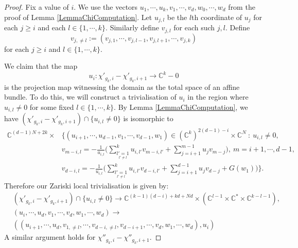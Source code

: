\documentclass[11pt]{amsart}
\newcommand{\bC}{\mathbb{C}}
\numberwithin{equation}{section}
\renewcommand{\geq}{\geqslant}
\newcommand{\C}{\mathbb C}
\begin{document}
\begin{proof}
	Fix a value of $i$. We use the vectors $u_1,\cdots,u_k,v_1,\cdots,v_d,w_0,\cdots,w_d$ from the proof of Lemma \ref{LemmaChiComputation}.
	Let $u_{j,l}$ be the $l$th coordinate of $u_j$ for each $j \geq i$ and each $l \in \{1,\cdots,k\}$.
	Similarly define $v_{j,l}$ for each such $j,l$.
	Define
	\begin{equation}
		v_{j,\neq l} := (v_{j,1},\cdots,v_{j,l-1},v_{j,l+1},\cdots,v_{j,k})
	\end{equation}
	for each $j \geq i$ and $l \in \{1,\cdots,k\}$.




	We claim that the map
	\begin{equation}
		u_i: \chi'_{g_k,i}-\chi'_{g_k,i+1} \to \C^k-0
	\end{equation}
	is the projection map witnessing the domain as the total space of an affine bundle.
	To do this, we will construct a trivialisation of $u_i$ in the region where $u_{i,l} \neq 0$ for some fixed $l \in \{1,\cdots,k\}$.
	By Lemma \ref{LemmaChiComputation}, we have $(\chi'_{g_k,i}-\chi'_{g_k,i+1}) \cap \{u_{i,l} \neq 0\}$ is isomorphic to
	\begin{equation} \label{eqnMainChiEqn2}
		\begin{aligned}
			\bC^{(d-1)N+2k} \times & \Big\{(u_{i+1},\cdots,u_{d-1},v_1,\cdots,v_{d-1},w_1)  \in (\bC^{k})^{2(d-1)-i} \times \bC^N \ : \
			u_{i,l} \neq 0,                                                                                                                                      \\ &
			v_{m-i,l} = -\frac{1}{u_{i,l}}\Big(\sum_{\underset{l' \neq l}{l'=1}}^k u_{i,l'}v_{m-i,l'} + \sum_{j=i+1}^{m-1} u_j v_{m-j}\Big), \ m=i+1,\cdots,d-1, \\ &
			v_{d-i,l} = -\frac{1}{u_{i,l}}\Big(\sum_{\underset{l' \neq l}{l'=1}}^k u_{i,l'}v_{d-i,l'} + \sum_{j=i+1}^{d-1} u_j v_{d-j}+G(w_1)\Big) \Big\}.
		\end{aligned}
	\end{equation}
	Therefore our Zariski local trivialisation is given by:
	\begin{equation}
		\begin{aligned}
			 & (\chi'_{g_k,i}-\chi'_{g_k,i+1}) \cap \{u_{i,l} \neq 0\} \to \bC^{(k-1)(d-i) + kd + Nd} \times (\bC^{l-1} \times \bC^* \times \bC^{k-l-1}),
			\\  & (u_i,\cdots,u_d,v_1,\cdots,v_d,w_1,\cdots,w_d) \to \\ &  ((u_{i+1},\cdots,u_d,v_{1,\neq l},\cdots,v_{d-i,\neq l},v_{d-i+1},\cdots,v_d,w_1,\cdots,w_d),u_i)
		\end{aligned}
	\end{equation}
	A similar argument holds for $\chi''_{g_k,i}-\chi''_{g_k,i+1}$.
\end{proof}
\end{document}

